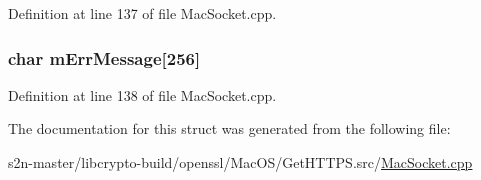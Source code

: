 Definition at line 137 of file Mac\+Socket.\+cpp.

\subsubsection[{\texorpdfstring{m\+Err\+Message}{mErrMessage}}]{\setlength{\rightskip}{0pt plus 5cm}char m\+Err\+Message\mbox{[}256\mbox{]}}\hypertarget{struct_socket_struct_a113aebf6f923d429a5ac322124a70d90}{}\label{struct_socket_struct_a113aebf6f923d429a5ac322124a70d90}


Definition at line 138 of file Mac\+Socket.\+cpp.



The documentation for this struct was generated from the following file\+:\begin{DoxyCompactItemize}
\item 
s2n-\/master/libcrypto-\/build/openssl/\+Mac\+O\+S/\+Get\+H\+T\+T\+P\+S.\+src/\hyperlink{_mac_socket_8cpp}{Mac\+Socket.\+cpp}\end{DoxyCompactItemize}

